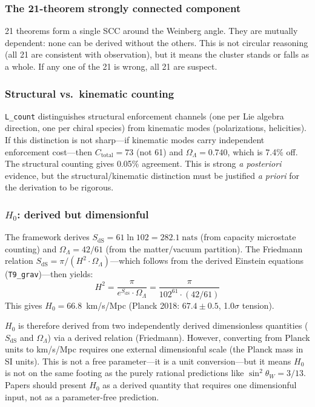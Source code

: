 \documentclass[11pt]{article}
\newcommand{\nats}{\;\mathrm{nats}}
\begin{document}
\subsubsection{The 21-theorem strongly connected component}

21 theorems form a single SCC around the Weinberg angle.  They are mutually dependent: none can be derived without the others.  This is not circular reasoning (all 21 are consistent with observation), but it means the cluster stands or falls as a whole.  If any one of the 21 is wrong, all 21 are suspect.

\subsubsection{Structural vs.\ kinematic counting}

\texttt{L\_count} distinguishes structural enforcement channels (one per Lie algebra direction, one per chiral species) from kinematic modes (polarizations, helicities).  If this distinction is not sharp---if kinematic modes carry independent enforcement cost---then $C_{\mathrm{total}} = 73$ (not 61) and $\Omega_\Lambda = 0.740$, which is 7.4\% off.  The structural counting gives 0.05\% agreement.  This is strong \emph{a posteriori} evidence, but the structural/kinematic distinction must be justified \emph{a priori} for the derivation to be rigorous.

\subsubsection{\texorpdfstring{$H_0$}{H0}: derived but dimensionful}

The framework derives $S_{\mathrm{dS}} = 61\ln 102 = 282.1\nats$ (from capacity microstate counting) and $\Omega_\Lambda = 42/61$ (from the matter/vacuum partition).  The Friedmann relation $S_{\mathrm{dS}} = \pi/(H^2 \cdot \Omega_\Lambda)$---which follows from the derived Einstein equations (\texttt{T9\_grav})---then yields:
\begin{equation}
H^2 = \frac{\pi}{e^{S_{\mathrm{dS}}} \cdot \Omega_\Lambda} = \frac{\pi}{102^{61} \cdot (42/61)}
\end{equation}
This gives $H_0 = 66.8$~km/s/Mpc (Planck 2018: $67.4 \pm 0.5$, 1.0$\sigma$ tension).

$H_0$ is therefore derived from two independently derived dimensionless quantities ($S_{\mathrm{dS}}$ and $\Omega_\Lambda$) via a derived relation (Friedmann).  However, converting from Planck units to km/s/Mpc requires one external dimensionful scale (the Planck mass in SI units).  This is not a free parameter---it is a unit conversion---but it means $H_0$ is not on the same footing as the purely rational predictions like $\sin^2\!\theta_W = 3/13$.  Papers should present $H_0$ as a derived quantity that requires one dimensionful input, not as a parameter-free prediction.
\end{document}
